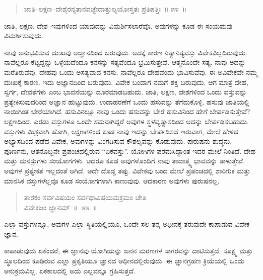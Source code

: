 \begin{verse}
ಜಾತಿ–ಲಕ್ಷಣ–ದೇಶೈರನ್ಯತಾನವಚ್ಛೇದಾತ್ತುಲ್ಯಯೋಸ್ತತಃ ಪ್ರತಿಪತ್ತಿಃ~॥ ೫೪~॥
\end{verse}

\vspace{-0.3cm}

ಜಾತಿ, ಲಕ್ಷಣ, ದೇಶ–ಇವುಗಳಿಂದ ಯಾವುದನ್ನು ವಿಮರ್ಶಿಸಲಾರೆವೊ, ಅವುಗಳನ್ನು ಕೂಡ ಈ ಸಂಯಮವು ವಿಮರ್ಶಿಸುವುದು. 

ನಾವು ಅನುಭವಿಸುವ ದುಃಖವು ಅಜ್ಞಾನದಿಂದ ಬರುವುದು. ಅದಕ್ಕೆ ಕಾರಣ ನಿತ್ಯಾನಿತ್ಯವಸ್ತು ವಿವೇಕವಿಲ್ಲದಿರುವುದು. ನಾವೆಲ್ಲರೂ ಕೆಟ್ಟದ್ದನ್ನು ಒಳ್ಳೆಯದೆಂದೂ ಕನಸನ್ನು ಸತ್ಯವೆಂದೂ ಭ್ರಮಿಸುತ್ತೇವೆ. ಆತ್ಮನೊಂದೇ ಸತ್ಯ. ನಾವು ಅದನ್ನು ಮರೆತಿರುವೆವು. ದೇಹವು ಒಂದು ಅಸತ್ಯವಾದ ಕನಸು. ನಾವೆಲ್ಲರೂ ದೇಹವೆಂದು ಭಾವಿಸುವೆವು. ಈ ಅವಿವೇಕವೇ ನಮ್ಮ ದುಃಖಕ್ಕೆ ಕಾರಣ. ಇದು ಅಜ್ಞಾನದಿಂದ ಬರುವುದು. ವಿವೇಕ ಬಂದಾಗ ನಮಗೆ ಶಕ್ತಿ ಬರುವುದು. ಆಗ ಮಾತ್ರ ದೇಹ, ಸ್ವರ್ಗ, ದೇವತೆಗಳು ಎಂಬ ಭಾವನೆಯನ್ನು ದೂರಮಾಡಬಹುದು. ಜಾತಿ, ಲಕ್ಷಣ, ದೇಶಗಳಿಂದ ಒಂದು ವಸ್ತುವನ್ನು ಪ್ರತ್ಯೇಕಿಸುವುದರಿಂದ ಅಜ್ಞಾನ ಹುಟ್ಟುವುದು. ಉದಾಹರಣೆಗೆ ಒಂದು ಹಸುವನ್ನು ತೆಗೆದುಕೊಳ್ಳಿ. ಹಸುವು ಜಾತಿಯಲ್ಲಿ ನಾಯಿಗಿಂತ ಬೇರೆಯಾಗಿದೆ. ಹಸುವಿನಲ್ಲೂ ನಾವು ಒಂದು ಹಸುವನ್ನು ಬೇರೆ ಹಸುವಿನಿಂದ ಹೇಗೆ ಬೇರ್ಪಡಿಸುತ್ತೇವೆ? ಲಕ್ಷಣದಿಂದ. ಎರಡು ವಸ್ತುಗಳೂ ಒಂದೇ ಸಮನಾಗಿದ್ದರೆ ಅವುಗಳ ಸ್ಥಳವ್ಯತ್ಯಾಸದಿಂದ ಅದನ್ನು ಬೇರ್ಪಡಿಸಬಹುದು. ವಸ್ತುಗಳು ಮಿಶ್ರವಾಗಿ ಹೋಗಿ, ಲಕ್ಷಣಗಳಿಂದ ಕೂಡ ನಾವು ಇದನ್ನು ಬೇರ್ಪಡಿಸದೆ ಇರುವಾಗ, ಮೇಲೆ ಹೇಳಿದ ಅಭ್ಯಾಸದಿಂದ ಪಡೆದ ವಿವೇಕ, ಅವುಗಳನ್ನು ವಿಂಗಡಿಸುವ ಕೌಶಲ್ಯವನ್ನು ಕೊಡುವುದು. ಪುರುಷನು ಶುದ್ಧನು, ಪೂರ್ಣನು, ಆತನೊಬ್ಬನೇ ಪ್ರಪಂಚದಲ್ಲಿರುವ “ಏಕವಸ್ತು”. ಯೋಗಿಗಳ ಪರಮಸಿದ್ಧಾಂತ ಇದರ ಮೇಲೆ ನಿಂತಿದೆ. ದೇಹ ಮತ್ತು ಮನಸ್ಸುಗಳು ಸಂಯೋಗಗಳು. ಆದರೂ ಕೂಡ ಅವುಗಳೊಂದಿಗೆ ನಾವು ತಾದಾತ್ಮ್ಯ ಭಾವವನ್ನು ತಾಳುತ್ತೇವೆ. ಅವುಗಳ ಪ್ರತ್ಯೇಕತೆ ಇಲ್ಲದಂತೆ ಆಗಿದೆ. ಅದೇ ದೊಡ್ಡ ತಪ್ಪು. ವಿವೇಕವು ಬಂದ ಮೇಲೆ ಪ್ರಪಂಚದಲ್ಲಿ ಶಾರೀರಿಕ ಮತ್ತು ಮಾನಸಿಕ ವಸ್ತುಗಳೆಲ್ಲವೂ ಕೂಡ ಸಂಯೋಗಗಳಾಗಿ ಕಾಣುವುವು. ಆದಕಾರಣ ಅವುಗಳು ಪುರುಷನಲ್ಲ. 

\vspace{-0.3cm}

\begin{verse}
ತಾರಕಂ ಸರ್ವವಿಷಯಂ ಸರ್ವಥಾವಿಷಯಮಕ್ರಮಂ ಚೇತಿ\\
 ವಿವೇಕಜಂ ಜ್ಞಾನಮ್​~\hfill{॥~೫೫~॥}
\end{verse}

\vspace{-0.3cm}

ಎಲ್ಲಾ ವಸ್ತುಗಳನ್ನೂ, ಅವುಗಳ ಎಲ್ಲಾ ಸ್ಥಿತಿಯಲ್ಲಿಯೂ, ಒಂದೇ ಸಲ ತನ್ನ ಅಧೀನಕ್ಕೆ ತರುವುದೇ ಕಾಪಾಡುವ ವಿವೇಕ ಜ್ಞಾನ. 

ಕಾಪಾಡುವುದು ಏಕೆಂದರೆ, ಈ ಜ್ಞಾನವು ಯೋಗಿಯನ್ನು ಜನನ ಮರಣಗಳ ಸಾಗರವನ್ನು ದಾಟಿಸುತ್ತದೆ. ಸೂಕ್ಷ್ಮ ಮತ್ತು ಸ್ಥೂಲದಿಂದ ಕೂಡಿರುವ ಎಲ್ಲಾ ಪ್ರಕೃತಿಯೂ ಜ್ಞಾನದ ಅಧೀನದಲ್ಲಿರುವುದು. ಈ ಜ್ಞಾನಗ್ರಹಣ ಕ್ರಿಯೆಯಲ್ಲಿ ಒಂದು ಅನುಕ್ರಮವಿಲ್ಲ, ಏಕಕಾಲದಲ್ಲಿ ಅದು ಎಲ್ಲವನ್ನೂ ಗ್ರಹಿಸುತ್ತದೆ. 

\vspace{-0.3cm}

